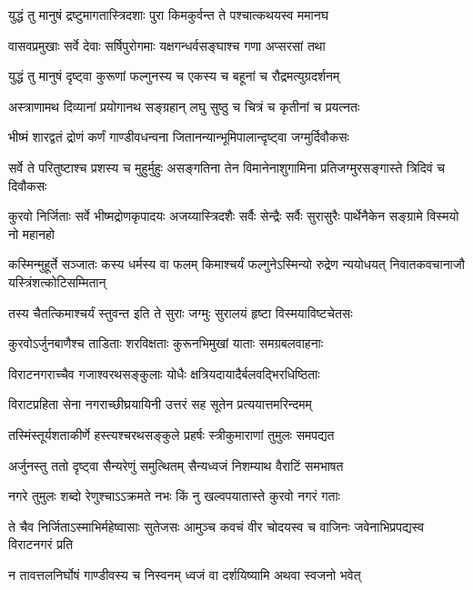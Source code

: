 \twolineshloka
{युद्धं तु मानुषं द्रष्टुमागतास्त्रिदशाः पुरा}
{किमकुर्वन्त ते पश्चात्कथयस्व ममानघ}



\twolineshloka
{वासवप्रमुखाः सर्वे देवाः सर्षिपुरोगमाः}
{यक्षगन्धर्वसङ्घाश्च गणा अप्सरसां तथा}


\twolineshloka
{युद्धं तु मानुषं दृष्ट्वा कुरूणां फल्गुनस्य च}
{एकस्य च बहूनां च रौद्रमत्युग्रदर्शनम्}


\twolineshloka
{अस्त्राणामथ दिव्यानां प्रयोगानथ सङ्ग्रहान्}
{लघु सुष्ठु च चित्रं च कृतीनां च प्रयत्नतः}


\twolineshloka
{भीष्मं शारद्वतं द्रोणं कर्णं गाण्डीवधन्वना}
{जितानन्यान्भूमिपालान्दृष्ट्वा जग्मुर्दिवौकसः}


\threelineshloka
{सर्वे ते परितुष्टाश्च प्रशस्य च मुहुर्मुहुः}
{असङ्गतिना तेन विमानेनाशुगामिना}
{प्रतिजग्मुरसङ्गास्ते त्रिदिवं च दिवौकसः}


\threelineshloka
{कुरवो निर्जिताः सर्वे भीष्मद्रोणकृपादयः}
{अजय्यास्त्रिदशैः सर्वैः सेन्द्रैः सर्वैः सुरासुरैः}
{पार्थेनैकेन सङ्ग्रामे विस्मयो नो महानहो}


\onelineshloka
{कस्मिन्मुहूर्ते सञ्जातः कस्य धर्मस्य वा फलम्}
\twolineshloka
{किमाश्चर्यं फल्गुनेऽस्मिन्यो रुद्रेण न्ययोधयत्}
{निवातकवचानाजौ यस्त्रिंशत्कोटिसम्मितान्}


\twolineshloka
{तस्य चैतत्किमाश्चर्यं स्तुवन्त इति ते सुराः}
{जग्मुः सुरालयं हृष्टा विस्मयाविष्टचेतसः}


\twolineshloka
{कुरवोऽर्जुनबाणैश्च ताडिताः शरविक्षताः}
{कुरूनभिमुखां याताः समग्रबलवाहनाः}


\twolineshloka
{विराटनगराच्चैव गजाश्वरथसङ्कुलाः}
{योधैः क्षत्रियदायादैर्बलवद्भिरधिष्ठिताः}


\twolineshloka
{विराटप्रहिता सेना नगराच्छीघ्रयायिनी}
{उत्तरं सह सूतेन प्रत्ययात्तमरिन्दमम्}


\twolineshloka
{तस्मिंस्तूर्यशताकीर्णे हस्त्यश्चरथसङ्कुले}
{प्रहर्षः स्त्रीकुमाराणां तुमुलः समपद्यत}


\twolineshloka
{अर्जुनस्तु ततो दृष्ट्वा सैन्यरेणुं समुत्थितम्}
{सैन्यध्वजं निशम्याथ वैराटिं समभाषत}


\twolineshloka
{नगरे तुमुलः शब्दो रेणुश्चाऽऽक्रमते नभः}
{किं नु खल्वपयातास्ते कुरवो नगरं गताः}


\threelineshloka
{ते चैव निर्जिताऽस्माभिर्महेष्वासाः सुतेजसः}
{आमुञ्च कवचं वीर चोदयस्व च वाजिनः}
{जवेनाभिप्रपद्यस्व विराटनगरं प्रति}


\twolineshloka
{न तावत्तलनिर्घोषं गाण्डीवस्य च निस्वनम्}
{ध्वजं वा दर्शयिष्यामि अथवा स्वजनो भवेत्}

